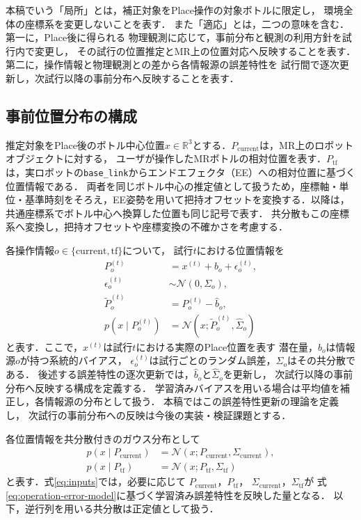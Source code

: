\documentclass{sice-si}
\newenvironment{dotsubequations}{%
  \begin{subequations}
  \renewcommand{\theequation}{\theparentequation.\arabic{equation}}%
}{\end{subequations}}
\begin{document}
本稿でいう「局所」とは，補正対象をPlace操作の対象ボトルに限定し，
環境全体の座標系を変更しないことを表す．
また「適応」とは，二つの意味を含む．第一に，Place後に得られる
物理観測に応じて，事前分布と観測の利用方針を試行内で変更し，
その試行の位置推定とMR上の位置対応へ反映することを表す．
第二に，操作情報と物理観測との差から各情報源の誤差特性を
試行間で逐次更新し，次試行以降の事前分布へ反映することを表す．

\subsection{事前位置分布の構成}
推定対象をPlace後のボトル中心位置$x\in\mathbb{R}^{3}$とする．$P_{\mathrm{current}}$は，MR上のロボットオブジェクトに対する，
ユーザが操作したMRボトルの相対位置を表す．$P_{\mathrm{tf}}$は，実ロボットの\texttt{base\_link}からエンドエフェクタ（EE）への相対位置に基づく位置情報である．
両者を同じボトル中心の推定値として扱うため，座標軸・単位・基準時刻をそろえ，EE姿勢を用いて把持オフセットを変換する．以降は，共通座標系でボトル中心へ換算した位置も同じ記号で表す．
共分散もこの座標系へ変換し，把持オフセットや座標変換の不確かさを考慮する．

各操作情報$o\in\{\mathrm{current},\mathrm{tf}\}$について，
試行$t$における位置情報を
\begin{dotsubequations}
\label{eq:operation-error-model}
\begin{align}
P_o^{(t)} &= x^{(t)}+b_o+\epsilon_o^{(t)},\\
\epsilon_o^{(t)} &\sim \mathcal{N}(0,\Sigma_o),\\
\tilde P_o^{(t)}&=P_o^{(t)}-\hat b_o,\\
p(x\mid P_o^{(t)})
&=\mathcal{N}(x;\tilde P_o^{(t)},\hat\Sigma_o)
\end{align}
\end{dotsubequations}
と表す．ここで，$x^{(t)}$は試行$t$における実際のPlace位置を表す
潜在量，$b_o$は情報源$o$が持つ系統的バイアス，
$\epsilon_o^{(t)}$は試行ごとのランダム誤差，$\Sigma_o$はその共分散である．
後述する誤差特性の逐次更新では，$\hat b_o$と$\hat\Sigma_o$を更新し，
次試行以降の事前分布へ反映する構成を定義する．
学習済みバイアスを用いる場合は平均値を補正し，各情報源の分布として扱う．
本稿ではこの誤差特性更新の理論を定義し，
次試行の事前分布への反映は今後の実装・検証課題とする．

各位置情報を共分散付きのガウス分布として
\begin{dotsubequations}
\label{eq:inputs}
\begin{align}
p(x\mid P_{\mathrm{current}})
  &=\mathcal{N}(x;P_{\mathrm{current}},\Sigma_{\mathrm{current}}),\\
p(x\mid P_{\mathrm{tf}})
  &=\mathcal{N}(x;P_{\mathrm{tf}},\Sigma_{\mathrm{tf}})
\end{align}
\end{dotsubequations}
と表す．式\eqref{eq:inputs}では，必要に応じて
$P_{\mathrm{current}}$，$P_{\mathrm{tf}}$，
$\Sigma_{\mathrm{current}}$，$\Sigma_{\mathrm{tf}}$が
式\eqref{eq:operation-error-model}に基づく学習済み誤差特性を反映した量となる．
以下，逆行列を用いる共分散は正定値として扱う．
\end{document}
